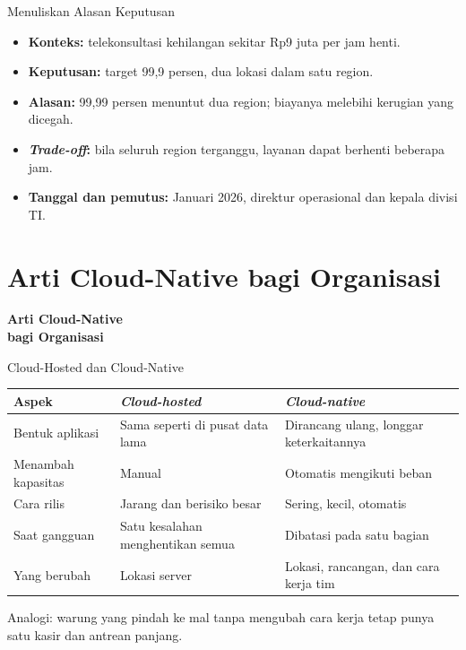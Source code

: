 \documentclass[aspectratio=169, table, 12pt]{beamer}
\begin{document}
\begin{frame}{Menuliskan Alasan Keputusan}
  \begin{itemize}
    \item \textbf{Konteks:} telekonsultasi kehilangan sekitar Rp9 juta per jam henti.
    \item \textbf{Keputusan:} target 99,9 persen, dua lokasi dalam satu region.
    \item \textbf{Alasan:} 99,99 persen menuntut dua region; biayanya melebihi
          kerugian yang dicegah.
    \item \textbf{\textit{Trade-off}:} bila seluruh region terganggu, layanan dapat
          berhenti beberapa jam.
    \item \textbf{Tanggal dan pemutus:} Januari 2026, direktur operasional dan kepala
          divisi TI.
  \end{itemize}
\end{frame}

\section{Arti Cloud-Native bagi Organisasi}

\begin{frame}{\hfill}
  \centering
  \Huge{\textbf{Arti Cloud-Native\\bagi Organisasi}}
\end{frame}

\begin{frame}{Cloud-Hosted dan Cloud-Native}
  \footnotesize
  \begin{tabularx}{\textwidth}{>{\raggedright\arraybackslash}p{3cm}
                               >{\raggedright\arraybackslash}X
                               >{\raggedright\arraybackslash}X}
    \hline
    \textbf{Aspek} & \textbf{\textit{Cloud-hosted}} & \textbf{\textit{Cloud-native}} \\
    \hline
    Bentuk aplikasi & Sama seperti di pusat data lama & Dirancang ulang, longgar
      keterkaitannya \\
    \hline
    Menambah kapasitas & Manual & Otomatis mengikuti beban \\
    \hline
    Cara rilis & Jarang dan berisiko besar & Sering, kecil, otomatis \\
    \hline
    Saat gangguan & Satu kesalahan menghentikan semua & Dibatasi pada satu bagian \\
    \hline
    Yang berubah & Lokasi server & Lokasi, rancangan, dan cara kerja tim \\
    \hline
  \end{tabularx}

  \vspace{8pt}
  \small Analogi: warung yang pindah ke mal tanpa mengubah cara kerja tetap punya
  satu kasir dan antrean panjang.
\end{frame}
\end{document}
